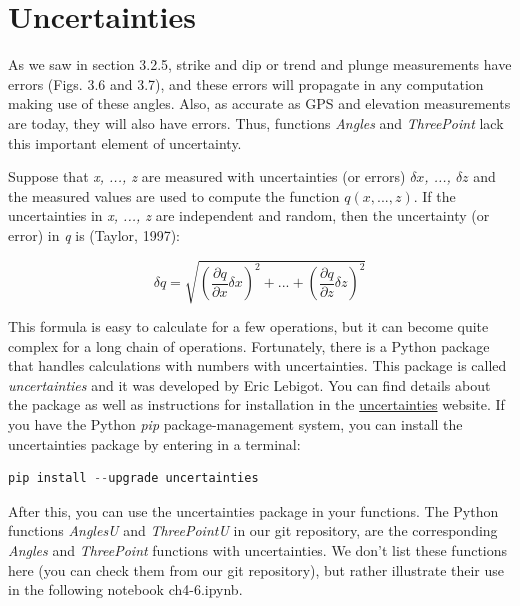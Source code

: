 \documentclass[a4paper , 12pt]{book}
\begin{document}
\section{Uncertainties}

As we saw in section 3.2.5, strike and dip or trend and plunge measurements have errors (Figs. 3.6 and 3.7), and these errors will propagate in any computation making use of these angles. Also, as accurate as GPS and elevation measurements are today, they will also have errors. Thus, functions \textit{Angles} and \textit{ThreePoint} lack this important element of uncertainty.

Suppose that \textit{x, ..., z} are measured with uncertainties (or errors) \textit{$\delta x$, ..., $\delta z$} and the measured values are used to compute the function $q(x,...,z)$. If the uncertainties in \textit{x, ..., z} are independent and random, then the uncertainty (or error) in \textit{q} is (Taylor, 1997):

\begin{equation}
    \delta q=\sqrt{\left(\frac{\partial q}{\partial x}\delta x \right)^2+...+\left(\frac{\partial q}{\partial z}\delta z \right)^2}\tag{4.16}
\end{equation}

This formula is easy to calculate for a few operations, but it can become quite complex for a long chain of operations. Fortunately, there is a Python package that handles calculations with numbers with uncertainties. This package is called \textit{uncertainties} and it was developed by Eric Lebigot. You can find details about the package as well as instructions for installation in the \href{https://pythonhosted.org/uncertainties/}{uncertainties} website. If you have the Python \textit{pip} package-management system, you can install the uncertainties package by entering in a terminal:

\begin{center}
\begin{lstlisting}[language=Python, frame=single]
pip install --upgrade uncertainties
\end{lstlisting}
\end{center}

After this, you can use the uncertainties package in your functions. The Python functions \textit{AnglesU} and \textit{ThreePointU} in our git repository, are the corresponding \textit{Angles} and \textit{ThreePoint} functions with uncertainties. We don't list these functions here (you can check them from our git repository), but rather illustrate their use in the following notebook ch4-6.ipynb.
\end{document}
